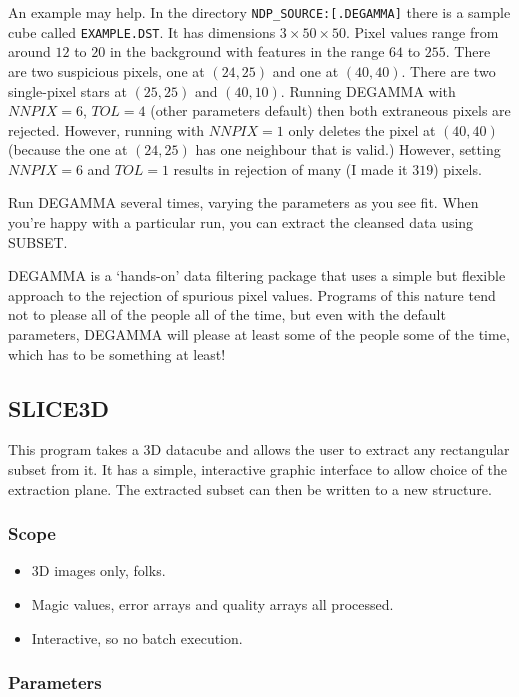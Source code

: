 An example may help. In the directory {\tt NDP\_SOURCE:[.DEGAMMA]} there is a
sample cube called {\tt EXAMPLE.DST}. It has dimensions $3\times 50\times 50$.
Pixel values range from around $12$ to $20$ in the background with features
in the range $64$ to $255$.
There are two suspicious pixels, one at $(24,25)$ and one at $(40,40)$.
There are two single-pixel stars at $(25,25)$ and $(40,10)$. Running DEGAMMA
with $NNPIX=6$, $TOL=4$ (other parameters default) then both extraneous pixels
are rejected. However, running with $NNPIX=1$ only deletes the pixel at
$(40,40)$ (because the one at $(24,25)$ has one neighbour that is valid.)
However, setting $NNPIX=6$ and $TOL=1$ results in rejection of many (I made it
$319$) pixels.

Run DEGAMMA several times, varying the parameters as you see fit. When you're
happy with a particular run, you can extract the cleansed data using SUBSET.

DEGAMMA is a `hands-on' data filtering package that uses a simple but flexible
approach to the rejection of spurious pixel values. Programs of
this nature tend not to please all of the people all of the time, but even 
with the default parameters, DEGAMMA will please at least some of the people 
some of the time, which has to be something at least! 

\subsection{SLICE3D}

This program takes a 3D datacube and allows the user to extract any rectangular
subset from it. It has a simple, interactive graphic interface to allow choice
of the extraction plane. The extracted subset can then be written to a new
structure.

\subsubsection{Scope}

\begin{itemize}
\item 3D images only, folks.
\item Magic values, error arrays and quality arrays all processed.
\item Interactive, so no batch execution.
\end{itemize}


\subsubsection{Parameters}

